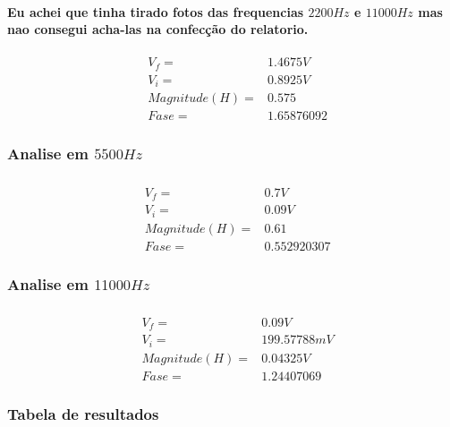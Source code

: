 \documentclass[12pt,twoside, a4paper, twocolumn]{article}
\begin{document}
\paragraph*{Eu achei que tinha tirado fotos das frequencias $2200Hz$ e $11000Hz$ mas nao consegui acha-las na confecção do relatorio.}

\begin{equation*}
    \begin{aligned}
         & V_f =          & 1.4675V    \\
         & V_i =          & 0.8925V    \\
         & Magnitude(H) = & 0.575      \\
         & Fase =         & 1.65876092
    \end{aligned}
\end{equation*}

\subsubsection{Analise em $5500Hz$}
\subparagraph*{}


\begin{equation*}
    \begin{aligned}
         & V_f =          & 0.7V        \\
         & V_i =          & 0.09V       \\
         & Magnitude(H) = & 0.61        \\
         & Fase =         & 0.552920307
    \end{aligned}
\end{equation*}


\subsubsection{Analise em $11000Hz$}
\subparagraph*{}


\begin{equation*}
    \begin{aligned}
         & V_f =          & 0.09V       \\
         & V_i =          & 199.57788mV \\
         & Magnitude(H) = & 0.04325V    \\
         & Fase =         & 1.24407069
    \end{aligned}
\end{equation*}

\subsubsection{Tabela de resultados}
\end{document}

